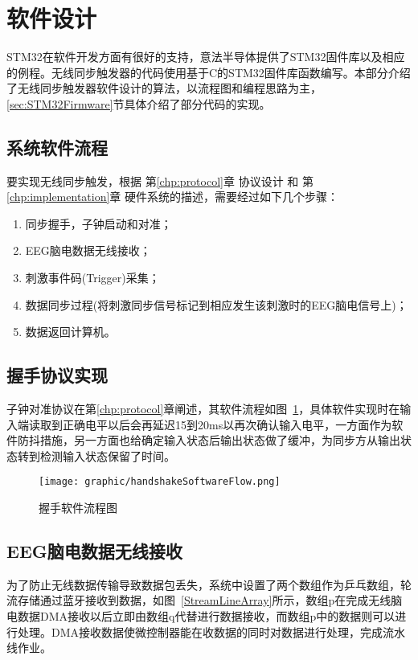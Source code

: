 \section{软件设计}

	STM32在软件开发方面有很好的支持，意法半导体提供了STM32固件库以及相应的例程。无线同步触发器的代码使用基于C的STM32固件库函数编写。本部分介绍了无线同步触发器软件设计的算法，以流程图和编程思路为主，\ref{sec:STM32Firmware}节具体介绍了部分代码的实现。

\subsection{系统软件流程}
	要实现无线同步触发，根据 第\ref{chp:protocol}章 协议设计 和 第\ref{chp:implementation}章 硬件系统的描述，需要经过如下几个步骤：
\begin{enumerate}
\item 	同步握手，子钟启动和对准；
\item 	EEG脑电数据无线接收；
\item 	刺激事件码(Trigger)采集；
\item 	数据同步过程(将刺激同步信号标记到相应发生该刺激时的EEG脑电信号上)；
\item	数据返回计算机。
\end{enumerate}

\subsection{握手协议实现}
	子钟对准协议在第\ref{chp:protocol}章阐述，其软件流程如图~\ref{hardhandshankeSoftwareFlow}，具体软件实现时在输入端读取到正确电平以后会再延迟15到20ms以再次确认输入电平，一方面作为软件防抖措施，另一方面也给确定输入状态后输出状态做了缓冲，为同步方从输出状态转到检测输入状态保留了时间。

\begin{figure}[!hbp]
\begin{center}
\texttt{[image: graphic/handshakeSoftwareFlow.png]}
\caption{握手软件流程图 \label{hardhandshankeSoftwareFlow}}
\end{center}
\end{figure}

\subsection{EEG脑电数据无线接收}
为了防止无线数据传输导致数据包丢失，系统中设置了两个数组作为乒乓数组，轮流存储通过蓝牙接收到数据，如图~\ref{StreamLineArray}所示，数组p在完成无线脑电数据DMA接收以后立即由数组q代替进行数据接收，而数组p中的数据则可以进行处理。DMA接收数据使微控制器能在收数据的同时对数据进行处理，完成流水线作业。

